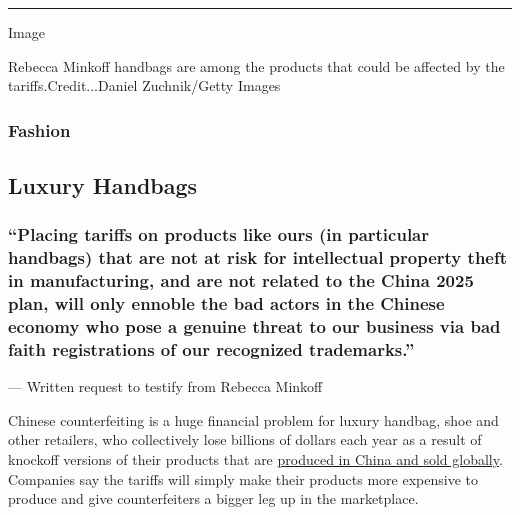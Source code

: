 \begin{center}\rule{0.5\linewidth}{\linethickness}\end{center}

Image

Rebecca Minkoff handbags are among the products that could be affected
by the tariffs.Credit...Daniel Zuchnik/Getty Images

\hypertarget{fashion}{%
\subsubsection{Fashion}\label{fashion}}

\hypertarget{luxury-handbags}{%
\subsection{Luxury Handbags}\label{luxury-handbags}}

\hypertarget{placing-tariffs-on-products-like-ours-in-particular-handbags-that-are-not-at-risk-for-intellectual-property-theft-in-manufacturing-and-are-not-related-to-the-china-2025-plan-will-only-ennoble-the-bad-actors-in-the-chinese-economy-who-pose-a-genuine-threat-to-our-business-via-bad-faith-registrations-of-our-recognized-trademarks-}{%
\subsubsection{``Placing tariffs on products like ours (in particular
handbags) that are not at risk for intellectual property theft in
manufacturing, and are not related to the China 2025 plan, will only
ennoble the bad actors in the Chinese economy who pose a genuine threat
to our business via bad faith registrations of our recognized
trademarks.''
}\label{placing-tariffs-on-products-like-ours-in-particular-handbags-that-are-not-at-risk-for-intellectual-property-theft-in-manufacturing-and-are-not-related-to-the-china-2025-plan-will-only-ennoble-the-bad-actors-in-the-chinese-economy-who-pose-a-genuine-threat-to-our-business-via-bad-faith-registrations-of-our-recognized-trademarks-}}

--- Written request to testify from Rebecca Minkoff

Chinese counterfeiting is a huge financial problem for luxury handbag,
shoe and other retailers, who collectively lose billions of dollars each
year as a result of knockoff versions of their products that are
\href{https://www.nytimes3xbfgragh.onion/2018/08/16/nyregion/fake-luxury-goods-handbags.html}{produced
in China and sold globally}. Companies say the tariffs will simply make
their products more expensive to produce and give counterfeiters a
bigger leg up in the marketplace.

